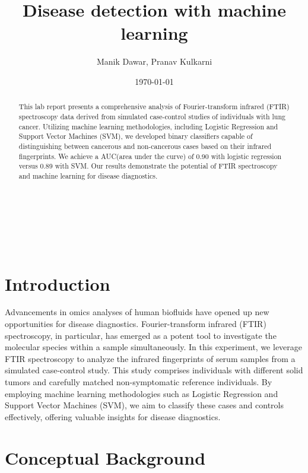 \documentclass{cernatsnote}
\title{Disease detection with machine learning}
\author{
	Manik Dawar, Pranav Kulkarni
}
\date{\today}
\begin{document}
\maketitle


\begin{abstract}
This lab report presents a comprehensive analysis of Fourier-transform infrared (FTIR) spectroscopy data derived from simulated case-control studies of individuals with lung cancer. Utilizing machine learning methodologies, including Logistic Regression and Support Vector Machines (SVM), we developed binary classifiers capable of distinguishing between cancerous and non-cancerous cases based on their infrared fingerprints. We achieve a AUC(area under the curve) of 0.90 with logistic regression versus 0.89 with SVM. Our results demonstrate the potential of FTIR spectroscopy and machine learning for disease diagnostics.
\end{abstract}



\\ \\ \\ 

\begingroup
\color{black}
\tableofcontents
\listoffigures 
\endgroup


\pagebreak

\section{Introduction}
Advancements in omics analyses of human biofluids have opened up new opportunities for disease diagnostics. Fourier-transform infrared (FTIR) spectroscopy, in particular, has emerged as a potent tool to investigate the molecular species within a sample simultaneously. In this experiment, we leverage FTIR spectroscopy to analyze the infrared fingerprints of serum samples from a simulated case-control study. This study comprises individuals with different solid tumors and carefully matched non-symptomatic reference individuals. By employing machine learning methodologies such as Logistic Regression and Support Vector Machines (SVM), we aim to classify these cases and controls effectively, offering valuable insights for disease diagnostics.





\section{Conceptual Background}
\end{document}

